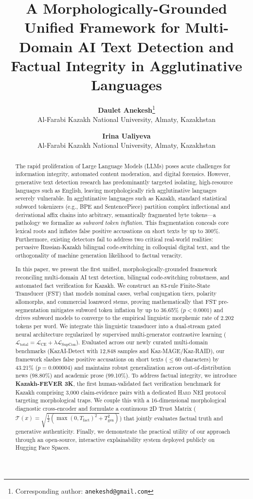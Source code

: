 \documentclass[11pt,a4paper]{article}
\title{\textbf{A Morphologically-Grounded Unified Framework for Multi-Domain AI Text Detection and Factual Integrity in Agglutinative Languages}}
\author{
  \textbf{Daulet Anekesh}\thanks{Corresponding author: \texttt{anekeshd@gmail.com}}\\
  Al-Farabi Kazakh National University, Almaty, Kazakhstan
  \and
  \textbf{Irina Ualiyeva}\\
  Al-Farabi Kazakh National University, Almaty, Kazakhstan
}
\date{}
\begin{document}
\maketitle

\begin{abstract}
The rapid proliferation of Large Language Models (LLMs) poses acute challenges for information integrity, automated content moderation, and digital forensics. However, generative text detection research has predominantly targeted isolating, high-resource languages such as English, leaving morphologically rich agglutinative languages severely vulnerable. In agglutinative languages such as Kazakh, standard statistical subword tokenizers (e.g., BPE and SentencePiece) partition complex inflectional and derivational affix chains into arbitrary, semantically fragmented byte tokens---a pathology we formalize as \textit{subword token inflation}. This fragmentation conceals core lexical roots and inflates false positive accusations on short texts by up to 300\%. Furthermore, existing detectors fail to address two critical real-world realities: pervasive Russian-Kazakh bilingual code-switching in colloquial digital text, and the orthogonality of machine generation likelihood to factual veracity.

In this paper, we present the first unified, morphologically-grounded framework reconciling multi-domain AI text detection, bilingual code-switching robustness, and automated fact verification for Kazakh. We construct an 83-rule Finite-State Transducer (FST) that models nominal cases, verbal conjugation tiers, polarity allomorphs, and commercial loanword stems, proving mathematically that FST pre-segmentation mitigates subword token inflation by up to 36.65\% ($p < 0.0001$) and drives subword models to converge to the empirical linguistic morphemic rate of 2.202 tokens per word. We integrate this linguistic transducer into a dual-stream gated neural architecture regularized by supervised multi-generator contrastive learning ($\mathcal{L}_{\text{total}} = \mathcal{L}_{\text{CE}} + \lambda \mathcal{L}_{\text{SupCon}}$). Evaluated across our newly curated multi-domain benchmarks (KazAI-Detect with 12,848 samples and Kaz-MAGE/Kaz-RAID), our framework slashes false positive accusations on short texts ($\le 60$ characters) by 43.21\% ($p = 0.000004$) and maintains robust generalization across out-of-distribution news (98.80\%) and academic prose (99.10\%). To address factual integrity, we introduce \textbf{Kazakh-FEVER 3K}, the first human-validated fact verification benchmark for Kazakh comprising 3,000 claim-evidence pairs with a dedicated \textsc{Hard NEI} protocol targeting morphological traps. We couple this with a 16-dimensional morphological diagnostic cross-encoder and formulate a continuous 2D Trust Matrix ($\mathcal{T}(x) = \sqrt{\frac{1}{2}(\max(0, T_{\text{fact}})^2 + T_{\text{gen}}^2)}$) that jointly evaluates factual truth and generative authenticity. Finally, we demonstrate the practical utility of our approach through an open-source, interactive explainability system deployed publicly on Hugging Face Spaces.
\end{abstract}
\end{document}
